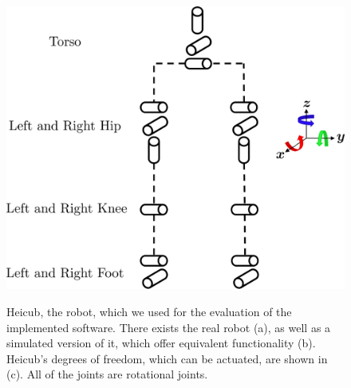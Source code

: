 \begin{figure}[h!]
	[.3\linewidth]{\includegraphics[scale=.35]{chapters/03_methods/img/kinematic_tree.png}}
	\caption{Heicub, the robot, which we used for the evaluation of the implemented software. There exists the real robot (a), as well as a simulated version of it, which offer equivalent functionality (b). Heicub's degrees of freedom, which can be actuated, are shown in (c). All of the joints are rotational joints.}
	\label{fig::34_hei}
\end{figure}
\FloatBarrier
